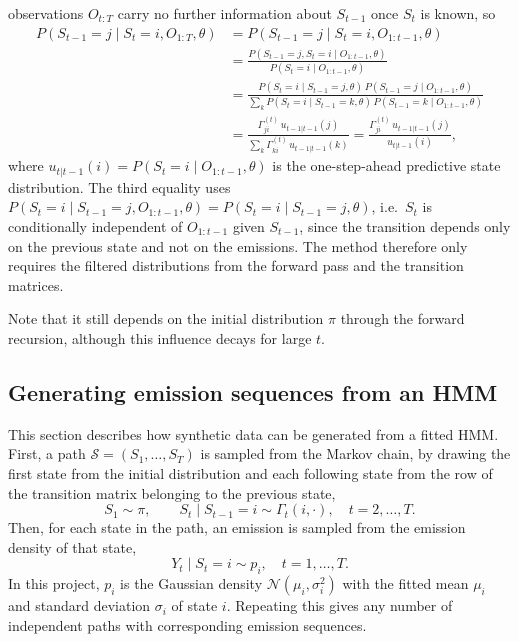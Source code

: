 observations $O_{t:T}$ carry no further information about $S_{t-1}$ once $S_t$ is
known, so
\begin{subequations}
\begin{align}
    P(S_{t-1}=j \mid S_t = i, O_{1:T}, \theta)
    &= P(S_{t-1}=j \mid S_t = i, O_{1:t-1}, \theta) \\
    &= \frac{P(S_{t-1}=j, S_t=i \mid O_{1:t-1}, \theta)}{P(S_t=i \mid O_{1:t-1}, \theta)} \\
    &= \frac{P(S_t = i \mid S_{t-1} = j, \theta)\, P(S_{t-1} = j \mid O_{1:t-1}, \theta)}
            {\sum_{k} P(S_t = i \mid S_{t-1} = k, \theta)\, P(S_{t-1} = k \mid O_{1:t-1}, \theta)} \\
    &= \frac{\Gamma^{(t)}_{ji}\, u_{t-1|t-1}(j)}{\sum_{k} \Gamma^{(t)}_{ki}\, u_{t-1|t-1}(k)}
     = \frac{\Gamma^{(t)}_{ji}\, u_{t-1|t-1}(j)}{u_{t|t-1}(i)},
\end{align}
\end{subequations}
where $u_{t|t-1}(i) = P(S_t = i \mid O_{1:t-1}, \theta)$ is the one-step-ahead
predictive state distribution. The third equality uses
$P(S_t = i \mid S_{t-1} = j, O_{1:t-1}, \theta) = P(S_t = i \mid S_{t-1} = j, \theta)$,
i.e.\ $S_t$ is conditionally independent of $O_{1:t-1}$ given $S_{t-1}$, since the
transition depends only on the previous state and not on the emissions. The method
therefore only requires the filtered distributions from the forward pass and the
transition matrices.

Note that it still depends on the initial distribution $\pi$ through the forward
recursion, although this influence decays for large $t$.

\subsection{Generating emission sequences from an HMM}
This section describes how synthetic data can be generated from a fitted HMM. First, a path
$\mathcal{S} = (S_1, \dots, S_T)$ is sampled from the Markov chain, by drawing the first state
from the initial distribution and each following state from the row of the transition matrix
belonging to the previous state,
\begin{equation}
    S_1 \sim \pi, \qquad S_t \mid S_{t-1} = i \sim \Gamma_t(i, \cdot), \quad t = 2, \dots, T.
\end{equation}
Then, for each state in the path, an emission is sampled from the emission density of that state,
\begin{equation}
    Y_t \mid S_t = i \sim p_i, \quad t = 1, \dots, T.
\end{equation}
In this project, $p_i$ is the Gaussian density $\mathcal{N}(\mu_i, \sigma_i^2)$ with the fitted
mean $\mu_i$ and standard deviation $\sigma_i$ of state $i$.
Repeating this gives any number of independent paths with corresponding emission sequences.

